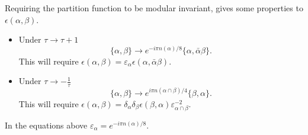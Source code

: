 \documentclass[mathserif]{beamer}
\begin{document}
\begin{frame}[shrink=20]
Requiring the partition function to be modular invariant, gives some properties to $\epsilon(\alpha,\beta)$.
\begin{itemize}
\item Under $\tau \rightarrow \tau+1$ 
$$
\{\alpha,\beta\} \rightarrow e^{-i\pi n(\alpha)/8}\{\alpha,\bar \alpha \beta\}.
$$
This will require $\epsilon(\alpha,\beta)=\varepsilon_\alpha\epsilon(\alpha,\bar \alpha \beta)$.
\item Under $\tau \rightarrow -\frac{1}{\tau}$ 
$$
\{\alpha,\beta\} \rightarrow e^{i\pi n(\alpha \cap \beta)/4}\{\beta, \alpha\}.
$$
This will require $\epsilon(\alpha,\beta)=\delta_\alpha\delta_\beta\epsilon(\beta, \alpha)\varepsilon_{\alpha \cap \beta}^{-2}$.
\end{itemize}
In the equations above $\varepsilon_\alpha=e^{-i\pi n(\alpha)/8}$.
\end{frame}
\end{document}
